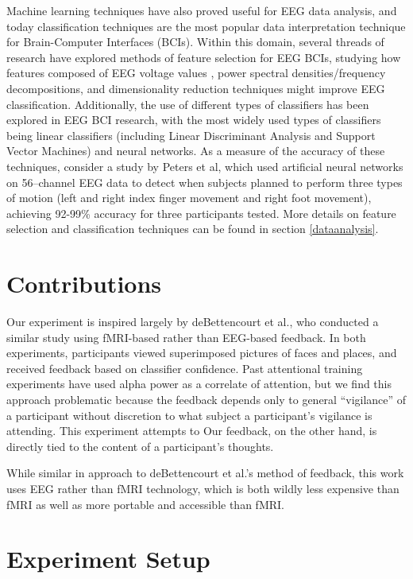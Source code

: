 \documentclass[12pt]{report}
\begin{document}
	Machine learning techniques have also proved useful for EEG data analysis, and today classification techniques are the most popular data interpretation technique for Brain-Computer Interfaces (BCIs)\cite{Lotte}.  Within this domain, several threads of research have explored methods of feature selection for EEG BCIs, studying how features composed of EEG voltage values\cite{Kaper} , power spectral densities/frequency decompositions\cite{Herman}, and dimensionality reduction techniques\cite{Kachenoura} might improve EEG classification.  Additionally, the use of different types of classifiers has been explored in EEG BCI research, with the most widely used types of classifiers being linear classifiers (including Linear Discriminant Analysis and Support Vector Machines) and neural networks\cite{Lotte}.  As a measure of the accuracy of these techniques, consider a study by Peters et al\cite{Peters}, which used artificial neural networks on 56--channel EEG data to detect when subjects planned to perform three types of motion (left and right index finger movement and right foot movement), achieving 92-99\% accuracy for three participants tested.  More details on feature selection and classification techniques can be found in section \ref{dataanalysis}.  

\chapter{Contributions}
	Our experiment is inspired largely by deBettencourt et al.\cite{deBettencourt}, 	who conducted a similar study using fMRI-based rather than EEG-based feedback.  In both experiments, participants viewed superimposed pictures of faces and places, and received feedback based on classifier confidence.  Past attentional training experiments have used alpha power as a correlate of attention, but we find this approach problematic because the feedback depends only to general “vigilance” of a participant without discretion to what subject a participant’s vigilance is attending.  This experiment attempts to Our feedback, on the other hand, is directly tied to the content of a participant’s thoughts.
	
	While similar in approach to deBettencourt et al.'s method of feedback, this work uses EEG rather than fMRI technology, which is both wildly less expensive than fMRI as well as more portable and accessible than fMRI.

\chapter{Experiment Setup}
\end{document}
